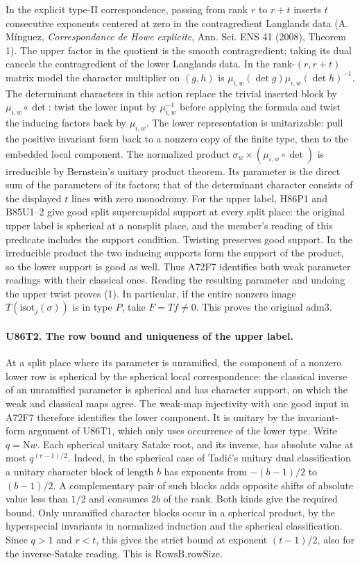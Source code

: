 In the explicit type-II correspondence, passing from rank $r$ to
$r+t$ inserts $t$ consecutive exponents centered at zero in the
contragredient Langlands data (A. M\'inguez, \emph{Correspondance
de Howe explicite}, Ann. Sci. ENS 41 (2008), Theorem 1).
The upper factor in the quotient is the smooth contragredient; taking its dual cancels the contragredient of the lower Langlands data.
In the rank-$(r,r+t)$ matrix model the character multiplier on
$(g,h)$ is $\mu_{i,w}(\det g)\mu_{i,w}(\det h)^{-1}$.
The determinant characters in this action replace the trivial
inserted block by $\mu_{i,w}\circ\det$: twist the lower input by
$\mu_{i,w}^{-1}$ before applying the formula and twist the inducing
factors back by $\mu_{i,w}$. The lower representation is
unitarizable: pull the positive invariant form back to a nonzero
copy of the finite type, then to the embedded local component.
The normalized product
$\sigma_w\times(\mu_{i,w}\circ\det)$ is irreducible by Bernstein's
unitary product theorem. Its parameter is the direct sum of the
parameters of its factors; that of the determinant character
consists of the displayed $t$ lines with zero monodromy. For the
upper label, H86P1 and B85U1--2 give good split supercuspidal
support at every split place: the original upper label is
spherical at a nonsplit place, and the member's reading of this
predicate includes the support condition. Twisting preserves
good support. In the irreducible product the two inducing supports
form the support of the product, so the lower support is good as
well. Thus A72F7 identifies both weak parameter readings with
their classical ones. Reading the resulting parameter and undoing the upper
twist proves (1). In particular, if the entire nonzero image
$T(\mathrm{isot}_j(\sigma))$ is in type $P$, take $F=Tf\ne0$.
This proves the original $\mathrm{adm3}$.

\paragraph{U86T2. The row bound and uniqueness of the upper label.}
At a split place where its parameter is unramified, the component
of a nonzero lower row is spherical by the spherical local
correspondence: the classical inverse of an unramified parameter is
spherical and has character support, on which the weak and classical
maps agree. The weak-map injectivity with one good input in A72F7
therefore identifies the lower component. It is unitary by the invariant-form argument of
U86T1, which only uses occurrence of the lower type. Write
$q=\mathrm Nw$. Each spherical unitary Satake root, and its
inverse, has absolute value at most $q^{(r-1)/2}$. Indeed, in the
spherical case of Tadi\'c's unitary dual classification a unitary
character block of length $b$ has exponents from $-(b-1)/2$ to
$(b-1)/2$. A complementary pair of such blocks adds opposite
shifts of absolute value less than $1/2$ and consumes $2b$ of the
rank. Both kinds give the required bound. Only unramified character
blocks occur in a spherical product, by the hyperspecial invariants
in normalized induction and the spherical classification. Since
$q>1$ and $r<t$, this gives the strict bound at exponent $(t-1)/2$,
also for the inverse-Satake reading. This is $\mathrm{RowsB.rowSize}$.

